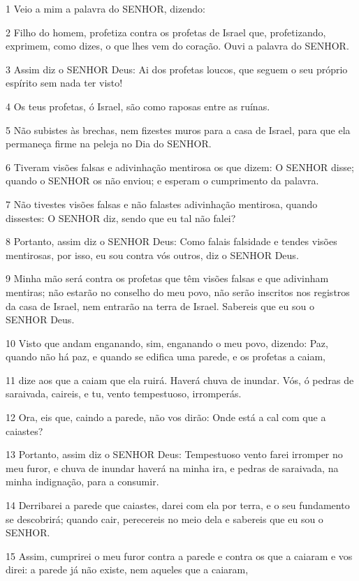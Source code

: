 \par 1 Veio a mim a palavra do SENHOR, dizendo:
\par 2 Filho do homem, profetiza contra os profetas de Israel que, profetizando, exprimem, como dizes, o que lhes vem do coração. Ouvi a palavra do SENHOR.
\par 3 Assim diz o SENHOR Deus: Ai dos profetas loucos, que seguem o seu próprio espírito sem nada ter visto!
\par 4 Os teus profetas, ó Israel, são como raposas entre as ruínas.
\par 5 Não subistes às brechas, nem fizestes muros para a casa de Israel, para que ela permaneça firme na peleja no Dia do SENHOR.
\par 6 Tiveram visões falsas e adivinhação mentirosa os que dizem: O SENHOR disse; quando o SENHOR os não enviou; e esperam o cumprimento da palavra.
\par 7 Não tivestes visões falsas e não falastes adivinhação mentirosa, quando dissestes: O SENHOR diz, sendo que eu tal não falei?
\par 8 Portanto, assim diz o SENHOR Deus: Como falais falsidade e tendes visões mentirosas, por isso, eu sou contra vós outros, diz o SENHOR Deus.
\par 9 Minha mão será contra os profetas que têm visões falsas e que adivinham mentiras; não estarão no conselho do meu povo, não serão inscritos nos registros da casa de Israel, nem entrarão na terra de Israel. Sabereis que eu sou o SENHOR Deus.
\par 10 Visto que andam enganando, sim, enganando o meu povo, dizendo: Paz, quando não há paz, e quando se edifica uma parede, e os profetas a caiam,
\par 11 dize aos que a caiam que ela ruirá. Haverá chuva de inundar. Vós, ó pedras de saraivada, caireis, e tu, vento tempestuoso, irromperás.
\par 12 Ora, eis que, caindo a parede, não vos dirão: Onde está a cal com que a caiastes?
\par 13 Portanto, assim diz o SENHOR Deus: Tempestuoso vento farei irromper no meu furor, e chuva de inundar haverá na minha ira, e pedras de saraivada, na minha indignação, para a consumir.
\par 14 Derribarei a parede que caiastes, darei com ela por terra, e o seu fundamento se descobrirá; quando cair, perecereis no meio dela e sabereis que eu sou o SENHOR.
\par 15 Assim, cumprirei o meu furor contra a parede e contra os que a caiaram e vos direi: a parede já não existe, nem aqueles que a caiaram,
